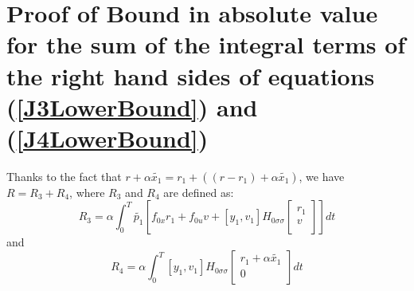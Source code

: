 \documentclass[a4paper,10pt]{article}
\begin{document}
\section{Proof of Bound in absolute value for the sum of the integral 
terms of the right hand sides of equations (\ref{J3LowerBound}) and 
(\ref{J4LowerBound})}\label{JuLowerBoundProof}
Thanks to the fact that 
$r+\alpha\tilde{x_{1}}= r_{1}+((r-r_{1})+\alpha\tilde{x_{1}})$,
 we have $R=R_{3}+R_{4}$, where $R_{3}$ and $R_{4}$ are defined as:
    \[
        R_{3}=\alpha \int_{0}^{T} \tilde{p_{1}}\left[f_{0x}r_{1} + f_{0u}v
	 + \left[y_{1},v_{1}\right]
	H_{0 \sigma \sigma}
	 \left[
	\begin{array}
	{c}
	    r_{1}  \\
	    v  \\
	\end{array}
	\right]\right] dt
    \]
and
    \[
        R_{4}=\alpha \int_{0}^{T} \left[y_{1},v_{1}\right]
	H_{0 \sigma \sigma}
	\left[
	\begin{array}
	{c}
	    r_{1}+\alpha\tilde{x_{1}}  \\
	    0  \\
	\end{array}
	\right] dt
    \]
\end{document}

